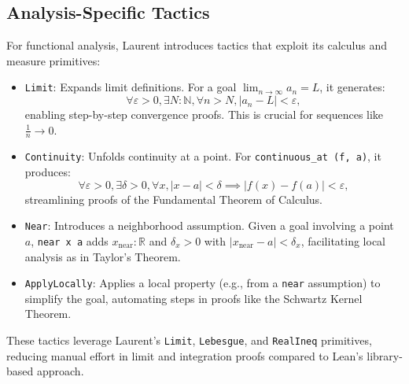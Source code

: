 \documentclass[12pt,twoside,draft]{cmpart}
\begin{document}
\subsection{Analysis-Specific Tactics}
For functional analysis, Laurent introduces tactics that exploit its calculus and measure primitives:
\begin{itemize}
\item \texttt{Limit}: Expands limit definitions. For a goal $\lim_{n \to \infty} a_n = L$, it generates:
\[
\forall \varepsilon > 0, \exists N : \mathbb{N}, \forall n > N, |a_n - L| < \varepsilon,
\]
enabling step-by-step convergence proofs. This is crucial for sequences like $\frac{1}{n} \to 0$.
\item \texttt{Continuity}: Unfolds continuity at a point. For \texttt{continuous\_at (f, a)}, it produces:
\[
\forall \varepsilon > 0, \exists \delta > 0, \forall x, |x - a| < \delta \implies |f(x) - f(a)| < \varepsilon,
\]
streamlining proofs of the Fundamental Theorem of Calculus.
\item \texttt{Near}: Introduces a neighborhood assumption. Given a goal involving a point $a$, \texttt{near x a} adds $x_{\text{near}} : \mathbb{R}$ and $\delta_x > 0$ with $|x_{\text{near}} - a| < \delta_x$, facilitating local analysis as in Taylor’s Theorem.
\item \texttt{ApplyLocally}: Applies a local property (e.g., from a \texttt{near} assumption) to simplify the goal, automating steps in proofs like the Schwartz Kernel Theorem.
\end{itemize}
These tactics leverage Laurent’s \texttt{Limit}, \texttt{Lebesgue}, and \texttt{RealIneq} primitives, reducing manual effort in limit and integration proofs compared to Lean’s library-based approach.
\end{document}
